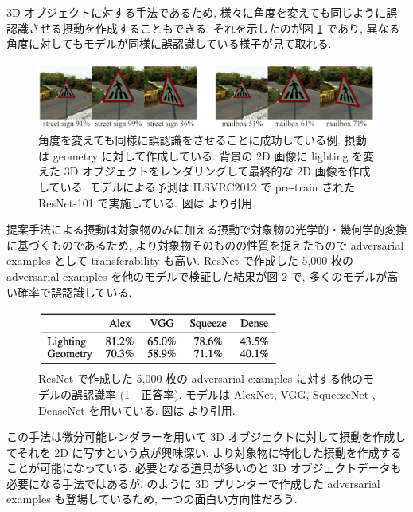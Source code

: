 3D オブジェクトに対する手法であるため, 様々に角度を変えても同じように誤認識させる摂動を作成することもできる.
それを示したのが図 \ref{fig:beyond-pixel-diff-angle} であり, 異なる角度に対してもモデルが同様に誤認識している様子が見て取れる.
%
\begin{figure}[htbp]
\begin{center}
\includegraphics[width=14.0cm]{figures/beyond-pixel-diff-angle.pdf}
\end{center}
\caption{
角度を変えても同様に誤認識をさせることに成功している例.
摂動は geometry に対して作成している.
背景の 2D 画像に lighting を変えた 3D オブジェクトをレンダリングして最終的な 2D 画像を作成している.
モデルによる予測は ILSVRC2012 で pre-train された ResNet-101 で実施している.
図は \cite{liu2018beyond} より引用.
}
\label{fig:beyond-pixel-diff-angle}
\end{figure}
%

提案手法による摂動は対象物のみに加える摂動で対象物の光学的・幾何学的変換に基づくものであるため, より対象物そのものの性質を捉えたもので adversarial examples として transferability も高い.
ResNet で作成した 5,000 枚の adversarial examples を他のモデルで検証した結果が図 \ref{fig:beyond-pixel-transferability} で, 多くのモデルが高い確率で誤認識している.
%
\begin{figure}[htbp]
\begin{center}
\includegraphics[width=8.0cm]{figures/beyond-pixel-transferability.pdf}
\end{center}
\caption{
ResNet で作成した 5,000 枚の adversarial examples に対する他のモデルの誤認識率 (1 - 正答率).
モデルは AlexNet, VGG, SqueezeNet \cite{iandola2016squeezenet}, DenseNet \cite{huang2017densely} を用いている.
図は \cite{liu2018beyond} より引用.
}
\label{fig:beyond-pixel-transferability}
\end{figure}
%

この手法は微分可能レンダラーを用いて 3D オブジェクトに対して摂動を作成してそれを 2D に写すという点が興味深い.
より対象物に特化した摂動を作成することが可能になっている.
必要となる道具が多いのと 3D オブジェクトデータも必要になる手法ではあるが, \cite{athalye2017synthesizing} のように 3D プリンターで作成した adversarial examples も登場しているため, 一つの面白い方向性だろう.



